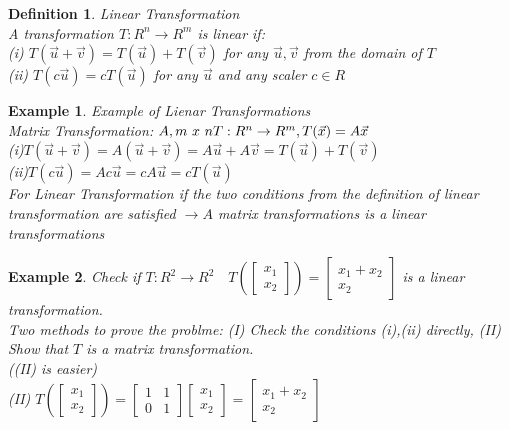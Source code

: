 \documentclass[a4paper,12pt,openany]{book}
\theoremstyle{defn}
\newtheorem{defn}{Definition}[section]
\theoremstyle{expl}
\newtheorem{expl}{Example}[section]
\begin{document}
\begin{defn}
\textup{
Linear Transformation\\
A transformation $T: R^n \rightarrow R^m$ is linear if:\\
(i) $T(\vec{u}+\vec{v})=T(\vec{u})+T(\vec{v})$ for any $\vec{u},\vec{v}$ from the domain of $T$\\
(ii) $T(c\vec{u})=cT(\vec{u})$ for any $\vec{u}$ and any scaler $c\in R$\\
}\end{defn}
\begin{expl} 
\textup{
Example of Lienar Transformations\\
Matrix Transformation: $A, m~x~n \\ T:R^n\rightarrow R^m, T(\vec{x})=A\vec{x}$\\
(i)$T(\vec{u}+\vec{v})=A(\vec{u}+\vec{v})=A\vec{u}+A\vec{v}=T(\vec{u})+T(\vec{v})$\\
(ii)$T(c\vec{u})=Ac\vec{u}=cA\vec{u}=cT(\vec{u})$\\
For Linear Transformation if the two conditions from the definition of linear transformation are satisfied $\rightarrow A$ matrix transformations is a linear transformations
}\end{expl}
\begin{expl}
\textup{
Check if $T:R^2\rightarrow R^2\quad T\left(\left[\begin{array}{c}x_1\\x_2\end{array}\right]\right)=\left[\begin{array}{c}x_1+x_2\\x_2\end{array}\right]$ is a linear transformation.\\
Two methods to prove the problme: (I) Check the conditions (i),(ii) directly, (II) Show that $T$ is a matrix transformation.\\((II) is easier)\\
(II) $T\left(\left[\begin{array}{c}x_1\\x_2\end{array}\right]\right)=\left[\begin{array}{cc}1&1\\0&1\end{array}\right]\left[\begin{array}{c}x_1\\x_2\end{array}\right]=\left[\begin{array}{c}x_1+x_2\\x_2\end{array}\right]$\\
}\end{expl}
\end{document}
